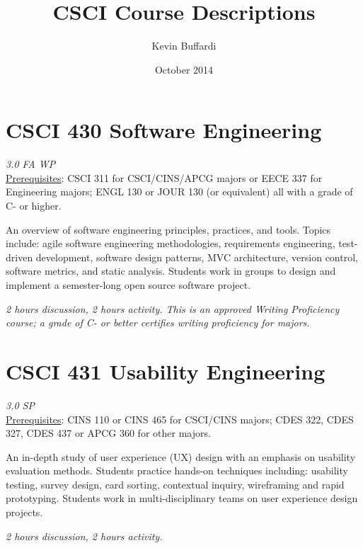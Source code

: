 \documentclass[12pt]{article}
\title{CSCI Course Descriptions}
\author{Kevin Buffardi}
\date{October 2014}
\begin{document}
  \maketitle
  \section*{CSCI 430 Software Engineering}	 	
  \textit{3.0 FA WP} \\
  \underline{Prerequisites}: CSCI 311 for CSCI/CINS/APCG majors or EECE 337 for Engineering majors; ENGL 130 or JOUR 130 (or equivalent) all with a grade of C- or higher.

  An overview of software engineering principles, practices, and tools. Topics include: agile software engineering methodologies, requirements engineering, test-driven development, software design patterns, MVC architecture, version control, software metrics, and static analysis. Students work in groups to design and implement a semester-long open source software project. 

  \textit{2 hours discussion, 2 hours activity. This is an approved Writing Proficiency course; a grade of C- or better certifies writing proficiency for majors.}
  
  \section*{CSCI 431 Usability Engineering}
  \textit{3.0 SP} \\
  \underline{Prerequisites}: CINS 110 or CINS 465 for CSCI/CINS majors; CDES 322, CDES 327, CDES 437 or APCG 360 for other majors.

  An in-depth study of user experience (UX) design with an emphasis on usability evaluation methods. Students practice hands-on techniques including: usability testing, survey design, card sorting, contextual inquiry, wireframing and rapid prototyping. Students work in multi-disciplinary teams on user experience design projects.

  \textit{2 hours discussion, 2 hours activity.}



\end{document}
